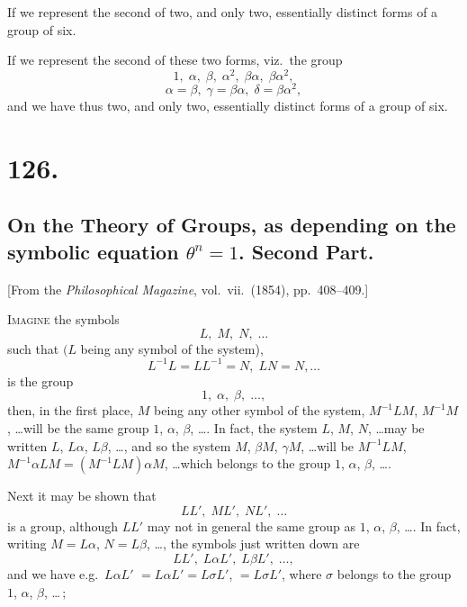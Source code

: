 \documentclass[11pt,a4paper]{article}
\theoremstyle{definition}
\begin{document}
If we represent the second of two, and only two, essentially distinct forms of a group of six.

\medskip

If we represent the second of these two forms, viz.\ the group
\[
1,\;\alpha,\;\beta,\;\alpha^2,\;\beta\alpha,\;\beta\alpha^2,
\]
\[
\alpha = \beta,\;\gamma = \beta\alpha,\;\delta = \beta\alpha^2,
\]
\noindent and we have thus two, and only two, essentially distinct forms of a group of six.

\medskip

\medskip

\section*{126.}
\subsection*{On the Theory of Groups, as depending on the symbolic equation $\theta^n=1$. Second Part.}

[From the \textit{Philosophical Magazine}, vol.\ vii.\ (1854), pp.\ 408--409.]

\medskip

\noindent\textsc{Imagine} the symbols
\[
L,\;M,\;N,\;\ldots
\]
such that $(L$ being any symbol of the system),
\[
L^{-1}L = LL^{-1} = N,\;LN = N,\ldots
\]
is the group
\[
1,\;\alpha,\;\beta,\;\ldots,
\]
then, in the first place, $M$ being any other symbol of the system, $M^{-1}LM$,
$M^{-1}M$, \ldots will be the same group $1$, $\alpha$, $\beta$, \ldots. In fact, the system $L$, $M$, $N$, \ldots may be
written $L$, $L\alpha$, $L\beta$, \ldots, and so the system $M$, $\beta M$, $\gamma M$, \ldots will be $M^{-1}LM$,
$M^{-1}\alpha LM = (M^{-1}LM)\alpha M$, \ldots which belongs to the group $1$, $\alpha$, $\beta$, \ldots.

\medskip

Next it may be shown that
\[
LL',\;ML',\;NL',\;\ldots
\]
is a group, although $LL'$ may not in general the same group as $1$, $\alpha$, $\beta$, \ldots. In fact, writing
$M = L\alpha$, $N = L\beta$, \ldots, the symbols just written down are
\[
LL',\;L\alpha L',\;L\beta L',\;\ldots,
\]
and we have e.g.\ $L\alpha L'$ $= L\alpha L' = L\sigma L'$, $= L\sigma L'$, where $\sigma$ belongs to the group $1$, $\alpha$, $\beta$, \ldots\,;
\end{document}
